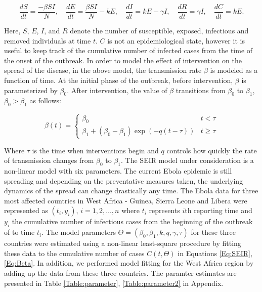 \documentclass[10pt, journal,onecolumn]{IEEEtran}
\begin{document}
\begin{equation}
\dfrac{dS}{dt}	=	\dfrac{-\beta SI}{N},
\quad
\dfrac{dE}{dt}	=	\dfrac{\beta SI}{N}-kE,
\quad
\dfrac{dI}{dt}	=	kE-\gamma I,
\quad
\dfrac{dR}{dt}	=	\gamma I,
\quad
\dfrac{dC}{dt}	=	kE.
\label{Eq:SEIR}
\end{equation}

Here, $S$, $E$, $I$, and $R$ denote the number of susceptible, exposed, infectious and removed
individuals at time $t$. $C$ is not an epidemiological state, however it is useful to keep track of the cumulative
number of infected cases from the time of the onset of the outbreak. In order to model the effect of intervention on the spread of the disease, in the above model, the transmission rate $\beta$ is modeled as a function of time. At the initial phase of the outbreak, before intervention, $\beta$ is parameterized by $\beta_0$. After intervention, the value of $\beta$ transitions from $\beta_0$ to $\beta_1$, $\beta_0>\beta_1$ as follows:

\begin{equation}
\beta(t)=\begin{cases}
\beta_{0} & t<\tau\\
\beta_{1}+(\beta_{0}-\beta_{1})\exp\left(-q\left(t-\tau\right)\right) & t\ge\tau
\end{cases}
\label{Eq:Beta}
\end{equation}

Where $\tau$ is the time when interventions begin and $q$ controls how quickly the rate
of transmission changes from $\beta_0$ to $\beta_1$.
The SEIR model under consideration is a non-linear model with six parameters. The current Ebola epidemic is
still spreading and depending on the preventative measures  taken, the underlying dynamics of the
spread can change drastically any time. The Ebola data for three most affected countries in West Africa - Guinea, Sierra Leone and Libera were represented as $(t_i,y_i)$, $i=1,2,\ldots,n$ where $t_i$ represents $i$th reporting time and $y_i$ the cumulative number of infectious cases from the beginning of the outbreak of to time $t_i$.  The model parameters $\Theta=(\beta_0,\beta_1,k,q,\gamma, \tau)$ for these three countries were estimated using a non-linear least-square procedure by fitting these data to the cumulative number of cases $C(t,\Theta)$ in Equations \eqref{Eq:SEIR},\eqref{Eq:Beta}. In addition, we performed model fitting for the West Africa region
by adding up the data from these three countries. The paramter estimates are presented in Table \ref{Table:parameter}, \ref{Table:parameter2} in Appendix.
\end{document}
